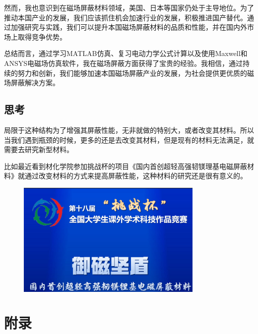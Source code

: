 \documentclass{article}
\begin{document}
然而，我也意识到在磁场屏蔽材料领域，美国、日本等国家仍处于主导地位。为了推动本国产业的发展，我们应该抓住机会加速行业的发展，积极推进国产替代。通过加强研究与实践，我们可以提升本国磁场屏蔽材料的品质和性能，并在国内外市场上取得竞争优势。

总结而言，通过学习MATLAB仿真、复习电动力学公式计算以及使用Maxwell和ANSYS电磁场仿真软件，我在磁场屏蔽方面获得了宝贵的经验。我相信，通过持续的努力和创新，我们能够加速本国磁场屏蔽产业的发展，为社会提供更优质的磁场屏蔽解决方案。
\subsection{思考}
局限于这种结构为了增强其屏蔽性能，无非就做的特别大，或者改变其材料。所以当我们遇到瓶颈的时候，更多的还是去改变其材料，但是现有的材料无法满足，就需要去研究新型材料。

比如最近看到材化学院参加挑战杯的项目《国内首创超轻高强韧镁理基电磁屏蔽材料》就通过改变材料的方式来提高屏蔽性能，这种材料的研究还是很有意义的。
        \begin{figure}[H]
            \centering
            \includegraphics[width=9cm]{img/11.png}
            \end{figure}

\section{附录}
\end{document}
